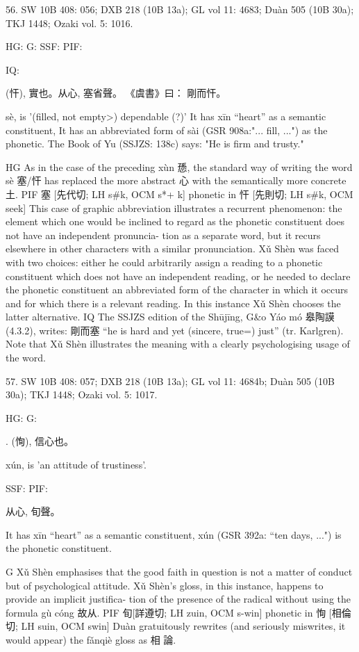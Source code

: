 56. SW 10B 408: 056; DXB 218 (10B 13a); GL vol 11: 4683; Duàn 505 (10B 30a); TKJ 1448; Ozaki vol. 5: 1016.


HG:
G: SSF: PIF:

IQ:

(忓),
實也。从心,
塞省聲。
《虞書》曰： 剛而忓。

sè,
is '(filled, not empty>) dependable (?)'
It has xīn ``heart'' as a semantic constituent,
It has an abbreviated form of sài (GSR 908a:"... fill, ...") as the phonetic.
The Book of Yu (SSJZS: 138c) says:
"He is firm and trusty."

HG As in the case of the preceding xùn 愻, the standard way of writing the word sè 塞/忓 has replaced the more abstract 心 with the semantically more concrete 土.
PIF   塞 [先代切; LH s\#k, OCM s*+ k] phonetic in 忓 [先則切; LH s\#k, OCM seek]
    This case of graphic abbreviation illustrates a recurrent phenomenon: the element which one would be inclined to regard as the phonetic constituent does not have an independent pronuncia- tion as a separate word, but it recurs elsewhere in other characters with a similar pronunciation. Xǔ Shèn was faced with two choices: either he could arbitrarily assign a reading to a phonetic constituent which does not have an independent reading, or he needed to declare the phonetic constituent an abbreviated form of the character in which it occurs and for which there is a relevant reading. In this instance Xǔ Shèn chooses the latter alternative.
IQ The SSJZS edition of the Shūjīng, G&o Yáo mó 皋陶謨 (4.3.2), writes: 剛而塞 ``he is hard and yet (sincere, true=) just'' (tr. Karlgren).
Note that Xǔ Shèn illustrates the meaning with a clearly psychologising usage of the word.


57. SW 10B 408: 057; DXB 218 (10B 13a); GL vol 11: 4684b; Duàn 505 (10B 30a); TKJ 1448; Ozaki vol. 5: 1017.


HG:
G:

. (恂),
信心也。


xún,
is 'an attitude of trustiness'.




SSF: PIF:

从心, 旬聲。

It has xīn ``heart'' as a semantic constituent,
xún (GSR 392a: ``ten days, ...") is the phonetic constituent.

G Xǔ Shèn emphasises that the good faith in question is not a matter of conduct but of psychological attitude. Xǔ Shèn's gloss, in this instance, happens to provide an implicit justifica- tion of the presence of the radical without using the formula gù cóng 故从.
PIF    旬[詳遵切; LH zuin, OCM s-win] phonetic in 恂 [相倫切; LH suin, OCM swin]
Duàn gratuitously rewrites (and seriously miswrites, it would appear) the fǎnqiè gloss as 相
論.


